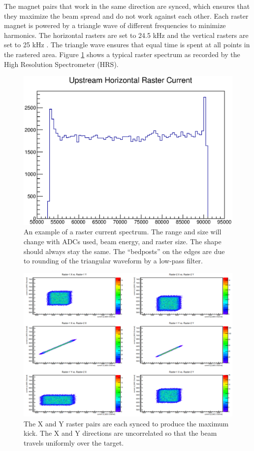The magnet pairs that work in the same direction are synced, which ensures that they maximize the beam spread and do not work against each other. Each raster magnet is powered by a triangle wave of different frequencies to minimize harmonics. The horizontal rasters are set to 24.5 kHz and the vertical rasters are set to 25 kHz \cite{rast_current}. The triangle wave ensures that equal time is spent at all points in the rastered area. Figure \ref{fig:exrast} shows a typical raster spectrum as recorded by the High Resolution Spectrometer (HRS).

\begin{figure}
	\includegraphics[width=\textwidth]{./chap2-exp/fig/ex_rast.eps}
	\caption{An example of a raster current spectrum. The range and size will change with ADCs used, beam energy, and raster size. The shape should always stay the same. The ``bedposts'' on the edges are due to rounding of the triangular waveform by a low-pass filter.}
	\label{fig:exrast}
\end{figure}

\begin{figure}
	\includegraphics[width=\linewidth]{./chap2-exp/fig/raster_sync.png}
	\caption{The X and Y raster pairs are each synced to produce the maximum kick. The X and Y directions are uncorrelated so that the beam travels uniformly over the target.}
	\label{fig:raster}
\end{figure}

